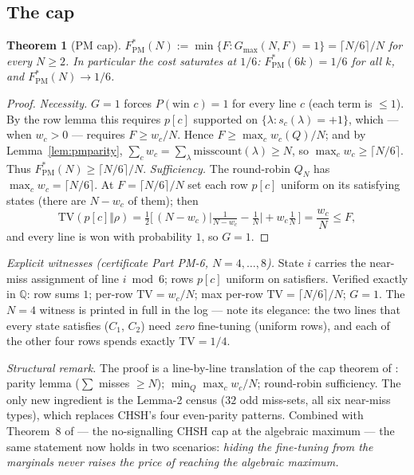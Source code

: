 \documentclass[aps,pra,reprint,superscriptaddress,floatfix]{revtex4-2}
\newcommand{\TV}{\mathrm{TV}}
\newtheorem{theorem}{Theorem}
\begin{document}
\subsection{The cap}

\begin{theorem}[PM cap]
\label{thm:pm4cap}
$F^{*}_{\mathrm{PM}}(N):=\min\{F:G_{\max}(N,F)=1\}=\lceil N/6
\rceil/N$ for every $N\ge 2$. In particular the cost \emph{saturates at
$1/6$}: $F^{*}_{\mathrm{PM}}(6k)=1/6$ for all $k$, and
$F^{*}_{\mathrm{PM}}(N)\to 1/6$.
\end{theorem}

\begin{proof}
\emph{Necessity.} $G=1$ forces $P(\text{win }c)=1$ for every line $c$
(each term is $\le 1$). By the row lemma this requires $p[c]$ supported on
$\{\lambda:s_{c}(\lambda)=+1\}$, which --- when $w_{c}>0$ --- requires
$F\ge w_{c}/N$. Hence $F\ge \max_{c}w_{c}(Q)/N$; and by
Lemma~\ref{lem:pmparity}, $\sum_{c}w_{c}=\sum_{\lambda}
\mathrm{misscount}(\lambda)\ge N$, so $\max_{c}w_{c}\ge\lceil N/6
\rceil$. Thus $F^{*}_{\mathrm{PM}}(N)\ge\lceil N/6\rceil/N$.
\emph{Sufficiency.} The round-robin $Q_{N}$ has $\max_{c}w_{c}=\lceil
N/6\rceil$. At $F=\lceil N/6\rceil/N$ set each row $p[c]$ uniform on its
satisfying states (there are $N-w_{c}$ of them); then
\begin{equation*}
\TV(p[c]\Vert\rho)=\tfrac12\Big[\,(N-w_{c})
\big|\tfrac{1}{N-w_{c}}-\tfrac1N\big|+w_{c}\tfrac1N\,\Big]
=\frac{w_{c}}{N}\le F,
\end{equation*}
and every line is won with probability $1$, so $G=1$.
\end{proof}

\emph{Explicit witnesses (certificate Part PM-6, $N=4,\dots,8$).} State
$i$ carries the near-miss assignment of line $i\bmod 6$; rows $p[c]$
uniform on satisfiers. Verified exactly in $\mathbb{Q}$: row sums $1$;
per-row $\TV=w_{c}/N$; max per-row $\TV=\lceil N/6\rceil/N$; $G=1$. The
$N=4$ witness is printed in full in the log --- note its elegance: the two
lines that every state satisfies ($C_{1}$, $C_{2}$) need \emph{zero}
fine-tuning (uniform rows), and each of the other four rows spends
exactly $\TV=1/4$.

\emph{Structural remark.} The proof is a line-by-line translation of the
cap theorem of \cite{mainpaper2026}: parity lemma
($\sum$ misses $\ge N$); $\min_{Q}\max_{c}w_{c}/N$; round-robin
sufficiency. The only new ingredient is the Lemma-2 census ($32$ odd
miss-sets, all six near-miss types), which replaces {CHSH}'s four
even-parity patterns. Combined with Theorem~8 of
\cite{mainpaper2026} --- the no-signalling {CHSH} cap at the algebraic
maximum --- the same statement now holds in two scenarios: \emph{hiding
the fine-tuning from the marginals never raises the price of reaching the
algebraic maximum.}
\end{document}

